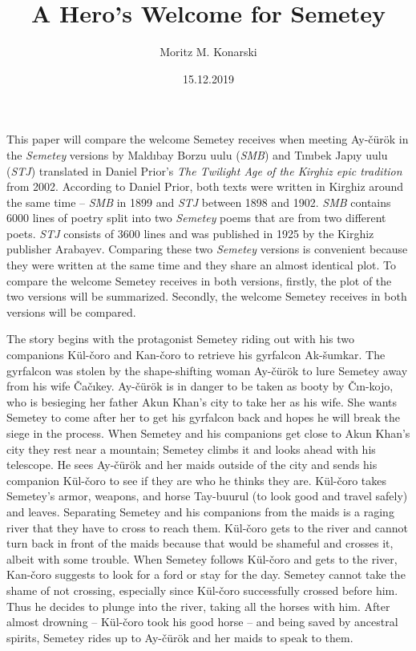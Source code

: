\documentclass[12pt,a4paper]{article}
\newcommand{\Se} {Semetey}
\newcommand{\Ac} {Ay-čürök}
\newcommand{\Ca} {Čačıkey}
\newcommand{\Ck} {Čın-kojo}
\newcommand{\As} {Ak-šumkar}
\newcommand{\Ak} {Akun Khan}
\newcommand{\Tb} {Tay-buurul}
\newcommand{\Mb} {Maldıbay Borzu uulu}
\newcommand{\Mbs}{\emph{SMB}}
\newcommand{\Tj} {Tınıbek Japıy uulu}
\newcommand{\Tjs}{\emph{STJ}}
\newcommand{\Dp} {Daniel Prior}
\newcommand{\Kuc}{Kül-čoro}
\newcommand{\Kac}{Kan-čoro}
\newcommand{\Dpt}{The Twilight Age of the Kirghiz epic tradition}
\begin{document}
\title{A Hero's Welcome for \Se{}}
\author{Moritz M. Konarski}
\date{15.12.2019}
\maketitle

This paper will compare the welcome \Se{} receives when meeting \Ac{} in the \emph{\Se{}}
versions by \Mb{} (\Mbs{}) and \Tj{} (\Tjs{}) translated in \Dp{}'s \emph{\Dpt} from 2002.
According to \Dp{}, both texts were written in Kirghiz around the same time --
\Mbs{} in 1899 and \Tjs{} between 1898 and 1902. \Mbs{} contains 6000
lines of poetry split into two \emph{\Se{}} poems that are from 
two different poets. \Tjs{} consists of 3600 lines and was published in 1925 by
the Kirghiz publisher Arabayev. Comparing these two \emph{\Se{}} versions is 
convenient because 
they were written at the same time and they share an almost identical plot. 
To compare the welcome \Se{} receives in both versions, firstly, the plot 
of the two versions will be summarized. Secondly, the welcome \Se{} receives in both
versions will be compared.

The story begins with the protagonist \Se{} riding out with his two companions \Kuc{} 
and \Kac{} to retrieve his gyrfalcon \As{}. The gyrfalcon was stolen by the
shape-shifting woman \Ac{} to 
lure \Se{} away from his wife \Ca{}. \Ac{} is in danger to be taken 
as booty by \Ck{}, who is besieging her father \Ak{}'s city to take her as his
wife. She wants \Se{} to come after her to get his gyrfalcon back and hopes he
will break the siege in the process.
When \Se{} and his companions get close to \Ak{}'s city they rest near
a mountain; \Se{} climbs it and looks ahead with his telescope. 
He sees \Ac{} and her maids outside of the city and sends his companion \Kuc{}
to see if they are who he thinks they are. \Kuc{} takes
\Se{}'s armor, weapons, and horse \Tb{} (to look good and travel safely) and leaves. 
Separating \Se{} and his companions from the
maids is a raging river that they have to cross to reach them.
\Kuc{} gets to the river and cannot turn 
back in front of the maids because that would be shameful and crosses it,
albeit with some trouble. 
When \Se{} follows \Kuc{} and gets to the river, \Kac{} suggests to look for a 
ford or stay for the day. \Se{} cannot take the shame of not crossing, especially 
since \Kuc{} successfully crossed before him. Thus he decides to plunge into the river, 
taking all the horses with him. After almost drowning -- \Kuc{} took his 
good horse -- and being saved by ancestral spirits, \Se{} rides up to \Ac{} and 
her maids to speak to them. 
\end{document}

